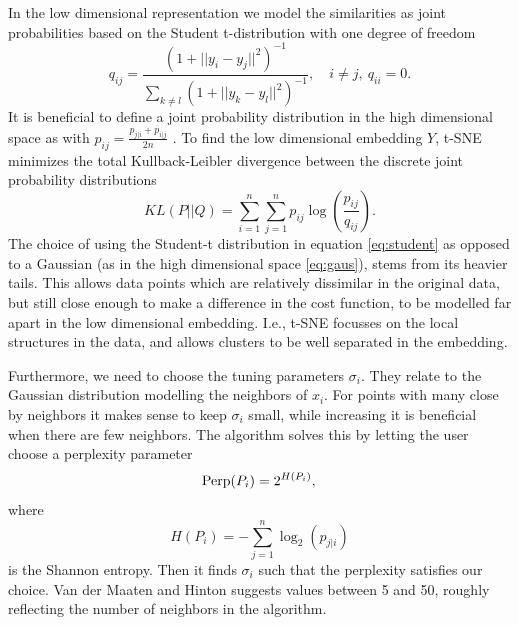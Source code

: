 \documentclass[a4paper]{memoir}
\theoremstyle{plain}
\theoremstyle{definition}
\theoremstyle{remark}
\begin{document}
In the low dimensional representation we model the similarities as joint probabilities based on the Student t-distribution with one degree of freedom
\begin{equation}\label{eq:student}
        q_{ij} = \frac{(1 + ||y_i - y_j||^2)^{-1}}{\sum_{k \neq  l}^{}(1 + ||y_k - y_l||^2)^{-1}}, \quad i \neq  j, \ q_{ii} = 0.
\end{equation}
It is beneficial to define a joint probability distribution in the high dimensional space as with $p_{ij}= \frac{p_{j|i} + p_{i|j}}{2n}$ \cite{hinton}.
To find the low dimensional embedding $Y$, t-SNE minimizes the total Kullback-Leibler divergence between the discrete joint probability distributions 
\begin{equation}\label{eq:KL}
        KL(P||Q) = \sum_{i = 1}^{n}\sum_{j = 1}^{n} p_{ij}\log \left( \frac{p_{ij}}{q_{ij}} \right).
\end{equation}
The choice of using the Student-t distribution in equation \eqref{eq:student} as opposed to a Gaussian (as in the high dimensional space \eqref{eq:gaus}), stems from its heavier tails.
This allows data points which are relatively dissimilar in the original data, but still close enough to make a difference in the cost function, to be modelled far apart in the low dimensional embedding.
I.e., t-SNE focusses on the local structures in the data, and allows clusters to be well separated in the embedding.

Furthermore, we need to choose the tuning parameters $\sigma_i$.
They relate to the Gaussian distribution modelling the neighbors of $x_i$.
For points with many close by neighbors it makes sense to keep $\sigma_i$ small, while increasing it is beneficial when there are few neighbors.
The algorithm solves this by letting the user choose a perplexity parameter
\begin{equation*}
        \text{Perp}(P_i) = 2^{H(P_i)}, \\
\end{equation*}
where 
\begin{equation*}
        H(P_i) = -\sum_{j = 1}^{n}\log_2(p_{j|i})
\end{equation*}
is the Shannon entropy.
Then it finds $\sigma_i$ such that the perplexity satisfies our choice.
Van der Maaten and Hinton \cite{hinton} suggests values between 5 and 50, roughly reflecting the number of neighbors in the algorithm.
\end{document}
